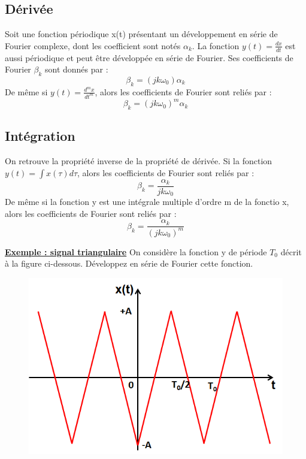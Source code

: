 	\subsection{Dérivée}
	Soit une fonction périodique x(t) présentant un développement en série de Fourier complexe, dont les coefficient sont notés $\alpha_{k}$. La fonction $y(t)=\frac{dx}{dt}$ est aussi périodique et peut être développée en série de Fourier. Ses coefficients de Fourier $\beta_{k}$ sont donnés par :
	\begin{equation}\label{derivee_Serie_Fourier}
	\beta_{k}=(jk\omega_{0})\alpha_{k}
	\end{equation}
	De même si $y(t)=\frac{d^{m}x}{dt^{m}}$, alors les coefficients de Fourier sont reliés par :
	\begin{equation}\label{derivee_Serie_Fourier_multiple}
	\beta_{k}=(jk\omega_{0})^{m}\alpha_{k}
	\end{equation}
	
	\subsection{Intégration}
	On retrouve la propriété inverse de la propriété de dérivée. Si la fonction $y(t)=\int x(\tau)d\tau$, alors les coefficients de Fourier sont reliés par :
	\begin{equation}\label{integrale_Serie_Fourier}
	\beta_{k}=\frac{\alpha_{k}}{jk\omega_{0}}
	\end{equation}
	De même si la fonction y est une intégrale multiple d'ordre m de la fonctio x,  alors les coefficients de Fourier sont reliés par :
	\begin{equation}\label{integrale_Serie_Fourier_multiple}
	\beta_{k}=\frac{\alpha_{k}}{(jk\omega_{0})^{m}}
	\end{equation}
	
	\underline{\textbf{Exemple : signal triangulaire}}
	On considère la fonction y de période $T_{0}$ décrit à la figure ci-dessous. Développez en série de Fourier cette fonction. 
	
	\begin{figure}[h!]
		\centering
		\includegraphics[scale=0.5]{images/signal_triangulaire.png}	
	\end{figure}
	
